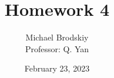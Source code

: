


\usepackage[dvipsnames,table]{xcolor}
\usepackage{siunitx} %
\usepackage{pgfplots}

\title{Homework 4}
\date{February 23, 2023}
\author{Michael Brodskiy\\ \small Professor: Q. Yan}



\maketitle

\newpage

